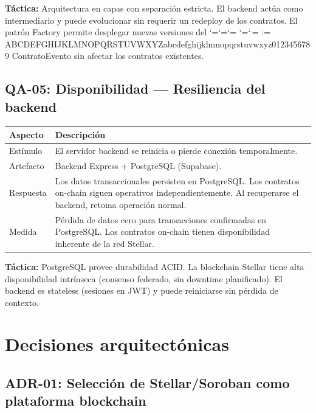 \documentclass[12pt,oneside]{article}
\makeatletter
\def\ttbreak@uscore{\char95\penalty0\hskip0pt\relax}%
\def\ttbreak@actcat#1{\catcode`#1=\active}%
\def\ttbreak@chars{%
  \catcode`\/=\active \catcode`\.=\active \catcode`\:=\active
  \catcode`\-=\active \catcode`\,=\active
  \@tfor\ttbreak@c:=%
ABCDEFGHIJKLMNOPQRSTUVWXYZabcdefghijklmnopqrstuvwxyz0123456789\do{%
    \expandafter\ttbreak@actcat\ttbreak@c}%
  \let\_\ttbreak@uscore}%
\DeclareRobustCommand{\texttt}{\begingroup\ttfamily\ttbreak@chars\ttbreak@grab}
\def\ttbreak@grab#1{#1\endgroup}
\makeatother
\begin{document}
\textbf{Táctica:} Arquitectura en capas con separación estricta. El backend actúa como intermediario y puede evolucionar sin requerir un redeploy de los contratos. El patrón Factory permite desplegar nuevas versiones del \texttt{ContratoEvento} sin afectar los contratos existentes.

\subsection{QA-05: Disponibilidad — Resiliencia del backend}

\begin{table}[htbp]
\centering
\begin{tabularx}{\textwidth}{l X}
\toprule
\textbf{Aspecto} & \textbf{Descripción} \\
\midrule
Estímulo & El servidor backend se reinicia o pierde conexión temporalmente. \\
Artefacto & Backend Express + PostgreSQL (Supabase). \\
Respuesta & Los datos transaccionales persisten en PostgreSQL. Los contratos on-chain siguen operativos independientemente. Al recuperarse el backend, retoma operación normal. \\
Medida & Pérdida de datos cero para transacciones confirmadas en PostgreSQL. Los contratos on-chain tienen disponibilidad inherente de la red Stellar. \\
\bottomrule
\end{tabularx}
\end{table}

\textbf{Táctica:} PostgreSQL provee durabilidad ACID. La blockchain Stellar tiene alta disponibilidad intrínseca (consenso federado, sin downtime planificado). El backend es stateless (sesiones en JWT) y puede reiniciarse sin pérdida de contexto.

\FloatBarrier
\clearpage
\section{Decisiones arquitectónicas}
\label{sec:decisiones}

\subsection{ADR-01: Selección de Stellar/Soroban como plataforma blockchain}
\end{document}
